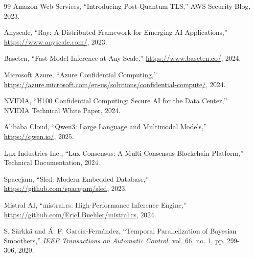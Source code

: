 \begin{thebibliography}{99}
Amazon Web Services, ``Introducing Post-Quantum TLS,''
AWS Security Blog, 2023.

Anyscale, ``Ray: A Distributed Framework for Emerging AI Applications,''
\url{https://www.anyscale.com/}, 2023.

Baseten, ``Fast Model Inference at Any Scale,''
\url{https://www.baseten.co/}, 2024.

Microsoft Azure, ``Azure Confidential Computing,''
\url{https://azure.microsoft.com/en-us/solutions/confidential-compute/}, 2024.

NVIDIA, ``H100 Confidential Computing: Secure AI for the Data Center,''
NVIDIA Technical White Paper, 2024.

Alibaba Cloud, ``Qwen3: Large Language and Multimodal Models,''
\url{https://qwen.io/}, 2025.

Lux Industries Inc., ``Lux Consensus: A Multi-Consensus Blockchain Platform,''
Technical Documentation, 2024.

Spacejam, ``Sled: Modern Embedded Database,''
\url{https://github.com/spacejam/sled}, 2023.

Mistral AI, ``mistral.rs: High-Performance Inference Engine,''
\url{https://github.com/EricLBuehler/mistral.rs}, 2024.

S. Särkkä and Á. F. García-Fernández, ``Temporal Parallelization of Bayesian Smoothers,''
\textit{IEEE Transactions on Automatic Control}, vol. 66, no. 1, pp. 299-306, 2020.

\end{thebibliography}


